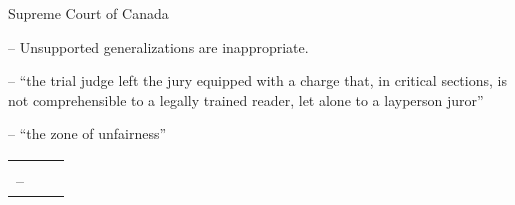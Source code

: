 \newenvironment{casenote}[1]
{
\begin{tcolorbox}[title=#1,
enhanced,
attach boxed title to top right,
boxed title style={colframe=blue!75!yellow!15,colback=violet!75,},
colback=red!5!white,
colframe=red!75!black,
fonttitle=\bfseries,
]
}
{\end{tcolorbox}
 }
\newenvironment{casequote}[1]
{
\begin{myquotation}
\begin{tcolorbox}[title=#1,
enhanced,
attach boxed title to top right,
boxed title style={colframe=blue!75!yellow!15,colback=violet!8,},
colback=brown!5!white,
colframe=brown!75!black,
fonttitle=\bfseries,
coltitle=green!25!black,
]\begin{tabular}{ccc}\cellcolor{yellow!30!brown!18}{\Large ``} & \cellcolor{brown!12!white}
\begin{minipage}{0.82\textwidth}
}
{\end{minipage} & \cellcolor{yellow!30!brown!18}{\Large''}\\\end{tabular}\end{tcolorbox}
\end{myquotation}
 }






\p Supreme Court of Canada

-- Unsupported generalizations are inappropriate.

-- ``the trial judge left the jury equipped with a charge that, in critical sections, is not comprehensible to a legally trained reader, let alone to a layperson juror''

-- ``the zone of unfairness''

\begin{casequote}{Access}Access to justice depends on the efficient and responsible use of court resources. Frivolous lawsuits, endless procedural delays, and unnecessary appeals increase the time and expense of litigation and waste these resources. To preserve meaningful access, courts must ensure that their resources remain available to the litigants who need them most — namely, those who advance meritorious and justiciable claims that warrant judicial attention. \\[0.8\baselineskip]
-- \lcinline[1]{ccd}
\end{casequote}

